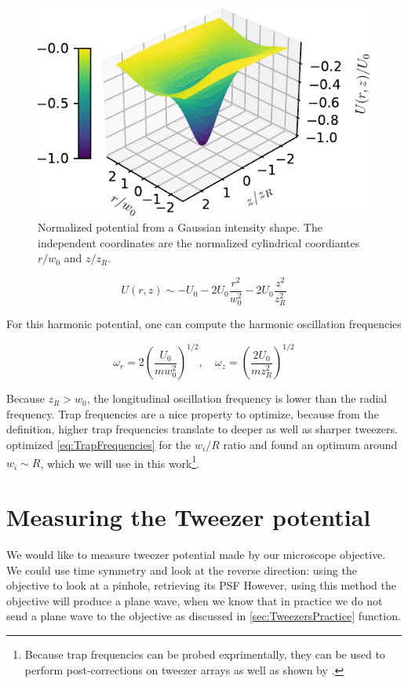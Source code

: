 \begin{figure}
    \centering
    \includegraphics[width=.56\linewidth]{figures/GaussianPotential.pdf}
    \caption{Normalized potential from a Gaussian intensity shape. The independent coordinates are the normalized cylindrical coordiantes $r/w_0$ and $z/z_R$.}
    \label{fig:GaussianPotential}
\end{figure}

\begin{equation}\label{eq:ApproximateGaussianPotential}
    U(r,z) \sim -U_0 - 2U_0 \frac{r^2}{w_0^2} - 2U_0 \frac{z^2}{z_R^2}
\end{equation}

For this harmonic potential, one can compute the harmonic oscillation frequencies 

\begin{equation}\label{eq:TrapFrequencies}
    \omega_r = 2\left(\frac{U_0}{m w_0^2}\right)^{1/2}, \quad
    \omega_z= \left(\frac{2 U_0}{m z_R^2}\right)^{1/2}
\end{equation}

Because $z_R > w_0$, the longitudinal oscillation frequency is lower than the radial frequency. 
Trap frequencies are a nice property to optimize, because from the definition, higher trap frequencies translate to deeper as well as sharper tweezers. 
\cite{Madjarov2021} optimized \cref{eq:TrapFrequencies} for the $w_i/R$ ratio and found an optimum around $w_i\sim R$, which we will use in this work\footnote{Because trap frequencies can be probed exprimentally, they can be used to perform post-corrections on tweezer arrays as well as shown by \cite{Ebadi2021}.}.

\section{Measuring the Tweezer potential}

We would like to measure tweezer potential made by our microscope objective. 
We could use time symmetry and look at the reverse direction: using the objective to look at a pinhole, retrieving its \acf{PSF} \cite{Knottnerus2018,Sortais2007}
However, using this method the objective will produce a plane wave, when we know that in practice we do not send a plane wave to the objective as discussed in \cref{sec:TweezersPractice}
function. 

